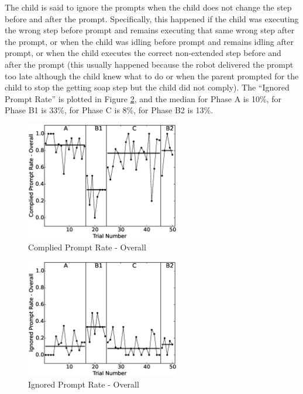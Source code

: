 The child is said to ignore the prompts when the child does not change the step before and after the prompt.  Specifically, this happened if the child was executing the wrong step before prompt and remains executing that same wrong step after the prompt, or when the child was idling before prompt and remains idling after prompt, or when the child executes the correct non-extended step before and after the prompt (this usually happened because the robot delivered the prompt too late although the child knew what to do or when the parent prompted for the child to stop the getting soap step but the child did not comply).  The ``Ignored Prompt Rate'' is plotted in Figure \ref{fig:1IgnoredPromptRate-Overall}, and the median for Phase A is 10\%, for Phase B1 is 33\%, for Phase C is 8\%, for Phase B2 is 13\%.
\begin{figure} [h]
	\centering
	\includegraphics[width=0.6\textwidth]{./img/data_analysis/4CompliedPromptRate-Overall.eps}
	\caption{Complied Prompt Rate - Overall}
	\label{fig:4CompliedPromptRate-Overall}
\end{figure}
\begin{figure} [h]
	\centering
	\includegraphics[width=0.6\textwidth]{./img/data_analysis/1IgnoredPromptRate-Overall.eps}
	\caption{Ignored Prompt Rate - Overall}
	\label{fig:1IgnoredPromptRate-Overall}
\end{figure}


